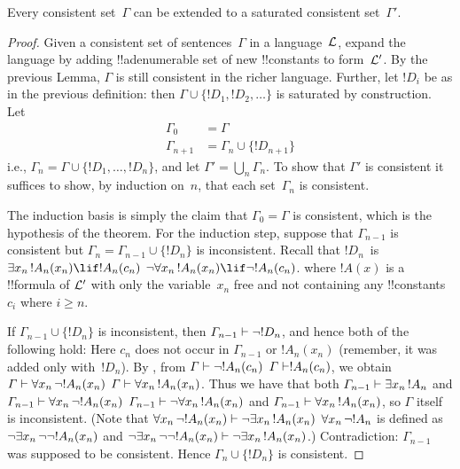 \documentclass[../../include/open-logic-section]{subfiles}
\begin{document}
\begin{thm}
Every consistent set~$\Gamma$ can be extended to a saturated
consistent set~$\Gamma'$.
\end{thm}

\begin{proof}
Given a consistent set of sentences~$\Gamma$ in a language~$\mathcal L$,
expand the language by adding !!a{denumerable} set of new
!!{constant}s to form~$\mathcal L'$. By the previous Lemma, $\Gamma$ is still
consistent in the richer language. Further, let $!D_i$ be as in the
previous definition: then $\Gamma \cup \{!D_1, !D_2, \dots\}$ is
saturated by construction. Let
\begin{align*}
\Gamma_0 & = \Gamma \\
\Gamma_{n+1} & = \Gamma_n \cup \{!D_{n+1} \}
\end{align*}
i.e., $\Gamma_n = \Gamma \cup \{ !D_1, \dots, !D_n \}$, and let
$\Gamma' = \bigcup_{n} \Gamma_n$.  To show that $\Gamma'$ is
consistent it suffices to show, by induction on~$n$, that each
set~$\Gamma_n$ is consistent.

The induction basis is simply the claim that $\Gamma_0 = \Gamma$ is
consistent, which is the hypothesis of the theorem.  For the induction
step, suppose that $\Gamma_{n-1}$ is consistent but $\Gamma_n =
\Gamma_{n-1} \cup \{!D_n\}$ is inconsistent. Recall that $!D_n$~is
{$\lexists[x_{n}][!A_{n}(x_n)] \lif !A_{n}(c_{n})$}
{$\lnot\lforall[x_{n}][!A_{n}(x_n)] \lif \lnot !A_{n}(c_{n})$}. 
where $!A(x)$ is a !!{formula} of $\mathcal L'$ with only the
variable~$x_n$ free and not containing any !!{constant}s~$c_i$ where
$i \ge n$.

If $\Gamma_{n-1} \cup \{!D_n\}$ is inconsistent, then $\Gamma_{n-1}
\Proves \lnot !D_n$, and hence both of the following hold:
Here $c_n$ does not occur in $\Gamma_{n-1}$ or $!A_n(x_n)$ (remember,
it was added only with~$!D_n$). By
, from
{$\Gamma \Proves \lnot !A_n(c_n)$} 
{$\Gamma \Proves !A_n(c_n)$}, 
we obtain 
{$\Gamma \Proves \lforall[x_n][\lnot !A_n(x_n)]$}
{$\Gamma \Proves \lforall[x_n][!A_n(x_n)]$}.
Thus we have that both 
{$\Gamma_{n-1} \Proves \lexists[x_n][!A_n]$ and 
$\Gamma_{n-1} \Proves \lforall[x_n][\lnot !A_n(x_n)]$}
{$\Gamma_{n-1} \Proves \lnot\lforall[x_n][!A_n(x_n)]$ and 
$\Gamma_{n-1} \Proves \lforall[x_n][!A_n(x_n)]$},
so $\Gamma$ itself is inconsistent. 
{(Note that 
{$\lforall[x_n][\lnot !A_n(x_n)] \Proves
  \lnot\lexists[x_n][!A_n(x_n)]$}
{$\lforall[x_n][\lnot !A_n]$ is defined as
  $\lnot\lexists[x_n][\lnot\lnot !A_n(x_n)]$ and
  $\lnot\lexists[x_n][\lnot\lnot !A_n(x_n)] \Proves
  \lnot\lexists[x_n][!A_n(x_n)]$}.)}{}
Contradiction: $\Gamma_{n-1}$ was supposed to be consistent. Hence
$\Gamma_n \cup \{ !D_n\}$ is consistent.
\end{proof}
\end{document}
